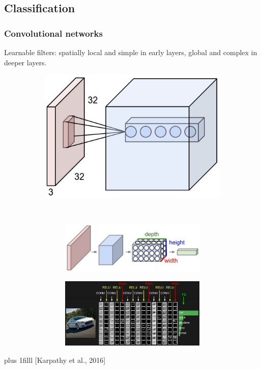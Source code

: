 \documentclass{beamer}
\newcommand{\source}[1]{\vskip0pt plus 1filll \scriptsize #1}
\begin{document}
	\subsection[Classification]{Classification}
	\begin{frame}
		\frametitle{Convolutional networks}
		Learnable filters: spatially local and simple in early layers, global and complex in deeper layers.
		\begin{figure}
			\centering
			\begin{subfigure}{0.4\textwidth}
				\includegraphics[width=\textwidth]{plots/convLayer.jpeg}
			\end{subfigure}
			~
			\begin{subfigure}{0.5\textwidth}
				\begin{subfigure}{\textwidth}
					\includegraphics[width=\textwidth]{plots/convNetVolumes.jpeg}
				\end{subfigure}
				\par \smallskip
				\begin{subfigure}{\textwidth}
					\includegraphics[width=\textwidth]{plots/convNetExample.jpeg}
				\end{subfigure}
			\end{subfigure}
		\end{figure}
		\source{[Karpathy et al., 2016]}
		

\end{frame}
\end{document}
